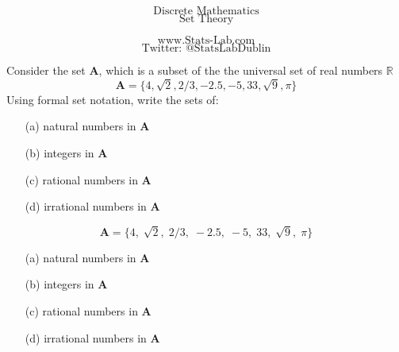 \documentclass{beamer}
\begin{document}
\begin{frame}
\Huge
\[\mbox{Discrete Mathematics}\]
\Huge
\[\mbox{Set Theory}\]

\Large
\[\mbox{www.Stats-Lab.com}\]
\Large
\[\mbox{Twitter: @StatsLabDublin}\]

\end{frame}
\begin{frame}
\Large
Consider the set \textbf{A}, which is a subset of the the universal set of real numbers $\mathbb{R}$
\[\boldsymbol{A} = \{4, \sqrt{2}, 2/3, -2.5, -5, 33, \sqrt{9}, \pi \}\]
Using formal set notation, write the sets of:
\begin{itemize}
\item[(a)] natural numbers in \textbf{A}
\item[(b)] integers in \textbf{A}
\item[(c)] rational numbers in \textbf{A}
\item[(d)] irrational numbers in \textbf{A}
\end{itemize}
\end{frame}
\begin{frame}
\Large
\vspace{-0.5cm}
\[\boldsymbol{A} = \{4,\; \sqrt{2},\; 2/3,\; -2.5,\; -5,\; 33,\; \sqrt{9},\; \pi \}\]
\vspace{-0.5cm}
\begin{itemize}
\item[(a)] natural numbers in \textbf{A}\\
\item[(b)] integers in \textbf{A}\\
\item[(c)] rational numbers in \textbf{A}\\
\item[(d)] irrational numbers in \textbf{A}\\
\end{itemize}
\end{frame}
\end{document}

